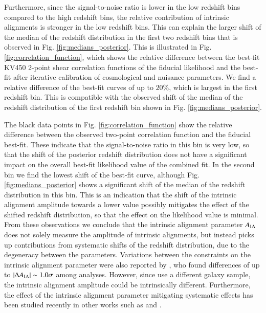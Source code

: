 \documentclass{aa}
\begin{document}
Furthermore, since the signal-to-noise ratio is lower in the low redshift bins compared to the high redshift bins, the relative contribution of intrinsic alignments is stronger in the low redshift bins. This can explain the larger shift of the median of the redshift distribution in the first two redshift bins that is observed in Fig. \ref{fig:medians_posterior}. This is illustrated in Fig. \ref{fig:correlation_function}, which shows the relative difference between the best-fit KV450 2-point shear correlation functions of the fiducial likelihood and the best-fit after iterative calibration of cosmological and nuisance parameters. We find a relative difference of the best-fit curves of up to $20 \%$, which is largest in the first redshift bin. This is compatible with the observed shift of the median of the redshift distribution of the first redshift bin shown in Fig. \ref{fig:medians_posterior}. 

The black data points in Fig. \ref{fig:correlation_function} show the relative difference between the observed two-point correlation function and the fiducial best-fit. These indicate that the signal-to-noise ratio in this bin is very low, so that the shift of the posterior redshift distribution does not have a significant impact on the overall best-fit likelihood value of the combined fit. In the second bin we find the lowest shift of the best-fit curve, although Fig. \ref{fig:medians_posterior} shows a significant shift of the median of the redshift distribution in this bin. This is an indication that the shift of the intrinsic alignment amplitude towards a lower value possibly mitigates the effect of the shifted redshift distribution, so that the effect on the likelihood value is minimal. From these observations we conclude that the intrinsic alignment parameter $A_{\rm IA}$ does not solely measure the amplitude of intrinsic alignments, but instead picks up contributions from systematic shifts of the redshift distribution, due to the degeneracy between the parameters. Variations between the constraints on the intrinsic alignment parameter were also reported by \cite{wright_som_kv450}, who found differences of up to $\left| \Delta A_{\rm IA} \right| \sim 1.0\sigma$ among analyses. However, since \cite{wright_som_kv450} use a different galaxy sample, the intrinsic alignment amplitude could be intrinsically different. Furthermore, the effect of the intrinsic alignment parameter mitigating systematic effects has been studied recently in other works such as \cite{vanUitert18} and \cite{Efstathiou18}.
\end{document}
